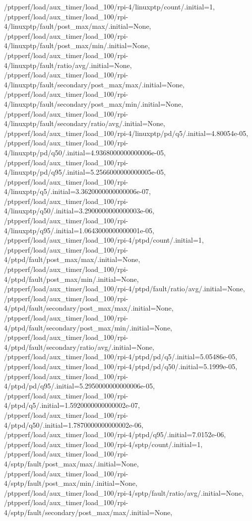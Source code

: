 {    /ptpperf/load/aux_timer/load_100/rpi-4/linuxptp/count/.initial=1,
    /ptpperf/load/aux_timer/load_100/rpi-4/linuxptp/fault/post_max/max/.initial=None,
    /ptpperf/load/aux_timer/load_100/rpi-4/linuxptp/fault/post_max/min/.initial=None,
    /ptpperf/load/aux_timer/load_100/rpi-4/linuxptp/fault/ratio/avg/.initial=None,
    /ptpperf/load/aux_timer/load_100/rpi-4/linuxptp/fault/secondary/post_max/max/.initial=None,
    /ptpperf/load/aux_timer/load_100/rpi-4/linuxptp/fault/secondary/post_max/min/.initial=None,
    /ptpperf/load/aux_timer/load_100/rpi-4/linuxptp/fault/secondary/ratio/avg/.initial=None,
    /ptpperf/load/aux_timer/load_100/rpi-4/linuxptp/pd/q5/.initial=4.80054e-05,
    /ptpperf/load/aux_timer/load_100/rpi-4/linuxptp/pd/q50/.initial=4.9368000000000006e-05,
    /ptpperf/load/aux_timer/load_100/rpi-4/linuxptp/pd/q95/.initial=5.2566000000000005e-05,
    /ptpperf/load/aux_timer/load_100/rpi-4/linuxptp/q5/.initial=3.3620000000000006e-07,
    /ptpperf/load/aux_timer/load_100/rpi-4/linuxptp/q50/.initial=3.2900000000000003e-06,
    /ptpperf/load/aux_timer/load_100/rpi-4/linuxptp/q95/.initial=1.0643000000000001e-05,
    /ptpperf/load/aux_timer/load_100/rpi-4/ptpd/count/.initial=1,
    /ptpperf/load/aux_timer/load_100/rpi-4/ptpd/fault/post_max/max/.initial=None,
    /ptpperf/load/aux_timer/load_100/rpi-4/ptpd/fault/post_max/min/.initial=None,
    /ptpperf/load/aux_timer/load_100/rpi-4/ptpd/fault/ratio/avg/.initial=None,
    /ptpperf/load/aux_timer/load_100/rpi-4/ptpd/fault/secondary/post_max/max/.initial=None,
    /ptpperf/load/aux_timer/load_100/rpi-4/ptpd/fault/secondary/post_max/min/.initial=None,
    /ptpperf/load/aux_timer/load_100/rpi-4/ptpd/fault/secondary/ratio/avg/.initial=None,
    /ptpperf/load/aux_timer/load_100/rpi-4/ptpd/pd/q5/.initial=5.05486e-05,
    /ptpperf/load/aux_timer/load_100/rpi-4/ptpd/pd/q50/.initial=5.1999e-05,
    /ptpperf/load/aux_timer/load_100/rpi-4/ptpd/pd/q95/.initial=5.2950000000000006e-05,
    /ptpperf/load/aux_timer/load_100/rpi-4/ptpd/q5/.initial=1.5920000000000002e-07,
    /ptpperf/load/aux_timer/load_100/rpi-4/ptpd/q50/.initial=1.7870000000000002e-06,
    /ptpperf/load/aux_timer/load_100/rpi-4/ptpd/q95/.initial=7.0152e-06,
    /ptpperf/load/aux_timer/load_100/rpi-4/sptp/count/.initial=1,
    /ptpperf/load/aux_timer/load_100/rpi-4/sptp/fault/post_max/max/.initial=None,
    /ptpperf/load/aux_timer/load_100/rpi-4/sptp/fault/post_max/min/.initial=None,
    /ptpperf/load/aux_timer/load_100/rpi-4/sptp/fault/ratio/avg/.initial=None,
    /ptpperf/load/aux_timer/load_100/rpi-4/sptp/fault/secondary/post_max/max/.initial=None,
}
